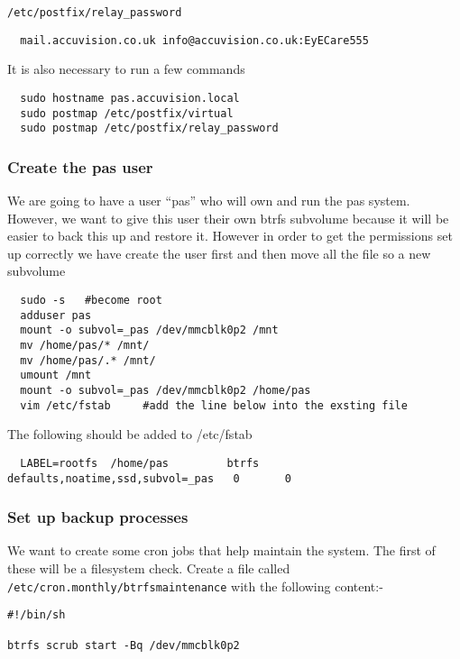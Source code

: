 \documentclass[Draft]{akc}
\begin{document}
\texttt{/etc/postfix/relay\_password}

\begin{lstlisting}
  mail.accuvision.co.uk info@accuvision.co.uk:EyECare555
\end{lstlisting}

It is also necessary to run a few commands
\begin{lstlisting}
  sudo hostname pas.accuvision.local
  sudo postmap /etc/postfix/virtual
  sudo postmap /etc/postfix/relay_password
\end{lstlisting}

\subsubsection{Create the pas user}

We are going to have a user ``pas'' who will own and run the pas system.  However, we want to give this
user their own btrfs subvolume because it will be easier to back this up and restore it.  However in order to get the permissions
set up correctly we have create the user first and then move all the file so a new subvolume
\begin{lstlisting}
  sudo -s   #become root
  adduser pas
  mount -o subvol=_pas /dev/mmcblk0p2 /mnt
  mv /home/pas/* /mnt/
  mv /home/pas/.* /mnt/
  umount /mnt
  mount -o subvol=_pas /dev/mmcblk0p2 /home/pas
  vim /etc/fstab     #add the line below into the exsting file
\end{lstlisting}

The following should be added to /etc/fstab
\begin{lstlisting}
  LABEL=rootfs  /home/pas	      btrfs   defaults,noatime,ssd,subvol=_pas   0       0
\end{lstlisting}

\subsubsection{Set up backup processes}

We want to create some cron jobs that help maintain the system.  The first of these will be a
filesystem check.  Create a file called \texttt{/etc/cron.monthly/btrfsmaintenance} with the
following content:-

\begin{lstlisting}
#!/bin/sh

btrfs scrub start -Bq /dev/mmcblk0p2

\end{lstlisting}
\end{document}
